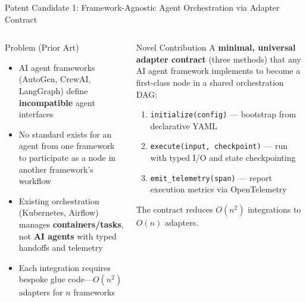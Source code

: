 \begin{frame}{\fontsize{9}{11}\selectfont Patent Candidate 1: Framework-Agnostic Agent Orchestration via Adapter Contract}
  \vspace{-0.3cm}

  \fontsize{5.5}{6.5}\selectfont
  \begin{columns}[T]
    \begin{alertblock}{\fontsize{5.5}{6.5}\selectfont Problem (Prior Art)}
      \fontsize{5.5}{6.5}\selectfont
      \begin{itemize}
        \setlength{\itemsep}{0pt}
        \item AI agent frameworks (AutoGen, CrewAI, LangGraph) define
              \textbf{incompatible} agent interfaces
        \item No standard exists for an agent from one framework to participate
              as a node in another framework's workflow
        \item Existing orchestration (Kubernetes, Airflow) manages
              \textbf{containers/tasks}, not \textbf{AI agents} with typed
              handoffs and telemetry
        \item Each integration requires bespoke glue code---$O(n^2)$ adapters
              for $n$ frameworks
      \end{itemize}
    \end{alertblock}

    \begin{block}{\fontsize{5.5}{6.5}\selectfont Novel Contribution}
      \fontsize{5.5}{6.5}\selectfont
      A \textbf{minimal, universal adapter contract} (three methods) that any AI
      agent framework implements to become a first-class node in a shared
      orchestration DAG:
      \begin{enumerate}
        \setlength{\itemsep}{0pt}
        \item \texttt{initialize(config)} --- bootstrap from declarative YAML
        \item \texttt{execute(input, checkpoint)} --- run with typed I/O and
              state checkpointing
        \item \texttt{emit\_telemetry(span)} --- report execution metrics via
              OpenTelemetry
      \end{enumerate}
      The contract reduces $O(n^2)$ integrations to $O(n)$ adapters.
    \end{block}


\end{columns}
\end{frame}
